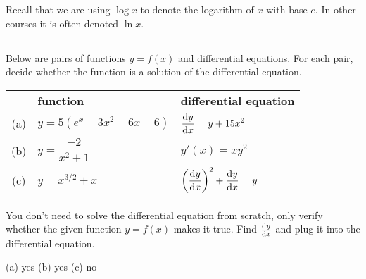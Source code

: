 %
%

\noindent
Recall that we are using $\log x$ to denote the logarithm of $x$ with
base $e$. In other courses it is often denoted $\ln x$.

\subsection*{\Conceptual}

\begin{Mquestion}
Below are pairs of functions $y=f(x)$ and differential equations. For each pair, decide whether the function is a solution of the differential equation.
\begin{center}
\begin{tabular}{c| l | l|}
\cline{2-3}
~&\textbf{function}&\textbf{differential equation}\\
\cline{2-3}
(a)&$y=5(e^x-3x^2-6x-6)$&$\displaystyle \diff{y}{x}=y+15x^2$\\
(b) & $y=\dfrac{-2}{x^2+1}$&$y'(x)=xy^2$\\
(c)&$y=x^{3/2}+x$&$\displaystyle\left(\diff{y}{x}\right)^2 + \diff{y}{x}=y$\\
\cline{2-3}
\end{tabular}
\end{center}
\end{Mquestion}
\begin{hint}
You don't need to solve the differential equation from scratch, only verify whether the given function $y=f(x)$ makes it true. Find $\diff{y}{x}$ and plug it into the differential equation.
\end{hint}
\begin{answer}
(a) yes \qquad (b) yes \qquad (c) no
\end{answer}
